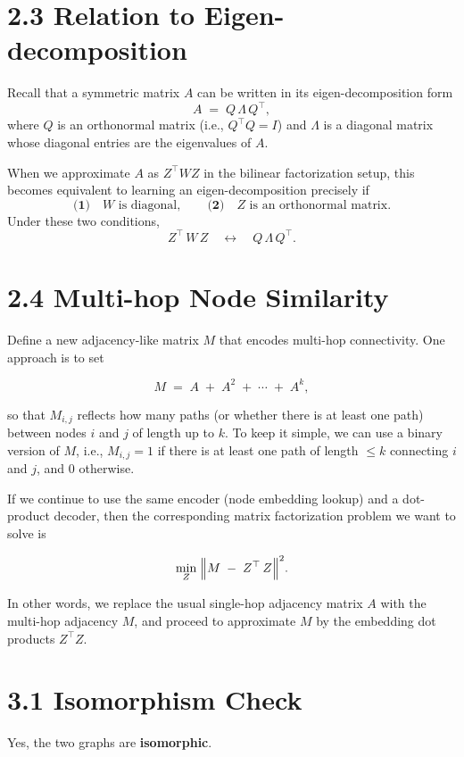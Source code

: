 \documentclass[a4paper,12pt]{article}
\begin{document}
\section*{2.3 Relation to Eigen-decomposition}

Recall that a symmetric matrix \(A\) can be written in its eigen-decomposition form
\[
A \;=\;Q \,\Lambda\,Q^{\top},
\]
where \(Q\) is an orthonormal matrix (i.e., \(Q^{\top}Q = I\)) and \(\Lambda\) is a diagonal
matrix whose diagonal entries are the eigenvalues of \(A\).

When we approximate \(A\) as \(Z^{\top}WZ\) in the bilinear factorization setup, this becomes
equivalent to learning an eigen-decomposition precisely if
\[
\textbf{(1)} \quad W \text{ is diagonal}, 
\qquad
\textbf{(2)} \quad Z \text{ is an orthonormal matrix}.
\]
Under these two conditions,
\[
Z^{\top} \,W \,Z
\quad\longleftrightarrow\quad
Q \,\Lambda\,Q^{\top}.
\]

\section*{2.4 Multi-hop Node Similarity}

Define a new adjacency-like matrix \(M\) that encodes multi-hop connectivity. One approach is to set

\[
M \;=\; A \;+\; A^{2} \;+\; \cdots \;+\; A^{k},
\]

so that \(M_{i,j}\) reflects how many paths (or whether there is at least one path)
between nodes \(i\) and \(j\) of length up to \(k\). To keep it simple, we can
use a binary version of \(M\), i.e., \(M_{i,j} = 1\) if there is at least one path of
length \(\le k\) connecting \(i\) and \(j\), and 0 otherwise.

If we continue to use the same encoder (node embedding lookup) and a dot-product
decoder, then the corresponding matrix factorization problem we want to solve is

\[
\min_{Z} \;\Bigl\lVert M \;-\;Z^{\top}\,Z\Bigr\rVert^{2}.
\]

In other words, we replace the usual single-hop adjacency matrix \(A\) with the
multi-hop adjacency \(M\), and proceed to approximate \(M\) by the embedding dot
products \(Z^{\top} Z\).





\section*{3.1 Isomorphism Check}
Yes, the two graphs are \textbf{isomorphic}.
\end{document}
